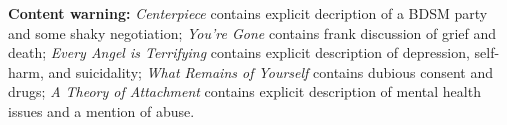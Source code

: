 \null

\vfill

\noindent \textbf{Content warning:} \emph{Centerpiece} contains explicit decription of a BDSM party and some shaky negotiation; \emph{You're Gone} contains frank discussion of grief and death; \emph{Every Angel is Terrifying} contains explicit description of depression, self-harm, and suicidality; \emph{What Remains of Yourself} contains dubious consent and drugs; \emph{A Theory of Attachment} contains explicit description of mental health issues and a mention of abuse.
